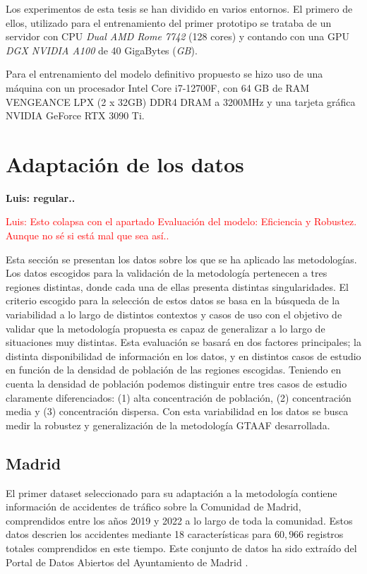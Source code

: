 \documentclass{uathesis-es}
\begin{document}
{	
	Los experimentos de esta tesis se han dividido en varios entornos. El primero de ellos, utilizado para el entrenamiento del primer prototipo se trataba de un servidor con CPU \textit{Dual AMD Rome 7742} (128 cores) y contando con una GPU \textit{DGX NVIDIA A100} de  40 GigaBytes (\textit{GB}).
	
	Para el entrenamiento del modelo definitivo propuesto se hizo uso de una máquina con un procesador Intel Core i7-12700F, con 64 GB de RAM VENGEANCE LPX (2 x 32GB) DDR4 DRAM a 3200MHz y una tarjeta gráfica NVIDIA GeForce RTX 3090 Ti.
	
	
	
	
	
	\section{Adaptación de los datos}
	
	\textbf{Luis: regular..}
	
	\textcolor{red}{Luis: Esto colapsa con el apartado Evaluación del modelo: Eficiencia y Robustez. Aunque no sé si está mal que sea así..}
	
	Esta sección se presentan los datos sobre los que se ha aplicado las metodologías. Los datos escogidos para la validación de la metodología pertenecen a tres regiones distintas, donde cada una de ellas presenta distintas singularidades. El criterio escogido para la selección de estos datos se basa en la búsqueda de la variabilidad a lo largo de distintos contextos y casos de uso con el objetivo de validar que la metodología propuesta es capaz de generalizar a lo largo de situaciones muy distintas. Esta evaluación se basará en dos factores principales; la distinta disponibilidad de información en los datos, y en distintos casos de estudio en función de la densidad de población de las regiones escogidas. Teniendo en cuenta la densidad de población podemos distinguir entre tres casos de estudio claramente diferenciados: (1) alta concentración de población, (2) concentración media y (3) concentración dispersa. Con esta variabilidad en los datos se busca medir la robustez y generalización de la metodología GTAAF desarrollada.
	
	
	
	\subsection*{Madrid}
	
	El primer dataset seleccionado para su adaptación a la metodología contiene información de accidentes de tráfico sobre la Comunidad de Madrid, comprendidos entre los años 2019 y 2022 a lo largo de toda la comunidad. Estos datos descrien los accidentes mediante 18 características para $60,966$ registros totales comprendidos en este tiempo. Este conjunto de datos ha sido extraído del Portal de Datos Abiertos del Ayuntamiento de Madrid \cite{InfoDatasetMadrid}. 
	
}
\end{document}
